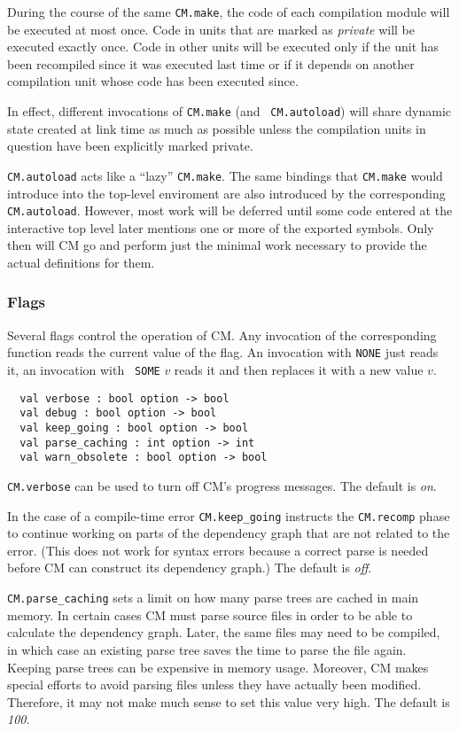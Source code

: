 \documentclass{article}
\begin{document}
During the course of the same {\tt CM.make}, the code of each
compilation module will be executed at most once.  Code in units that
are marked as {\it private} will be executed exactly once.  Code in
other units will be executed only if the unit has been recompiled
since it was executed last time or if it depends on another
compilation unit whose code has been executed since.

In effect, different invocations of {\tt CM.make} (and {\tt
CM.autoload}) will share dynamic state created at link time as much as
possible unless the compilation units in question have been explicitly
marked private.

{\tt CM.autoload} acts like a ``lazy'' {\tt CM.make}.  The same
bindings that {\tt CM.make} would introduce into the top-level
enviroment are also introduced by the corresponding {\tt CM.autoload}.
However, most work will be deferred until some code entered at the
interactive top level later mentions one or more of the exported
symbols.  Only then will CM go and perform just the minimal work
necessary to provide the actual definitions for them.

\subsubsection*{Flags}

Several flags control the operation of CM.  Any invocation of the
corresponding function reads the current value of the flag.  An
invocation with {\tt NONE} just reads it, an invocation with {\tt
SOME} $v$ reads it and then replaces it with a new value $v$.

\begin{verbatim}
  val verbose : bool option -> bool
  val debug : bool option -> bool
  val keep_going : bool option -> bool
  val parse_caching : int option -> int
  val warn_obsolete : bool option -> bool
\end{verbatim}

{\tt CM.verbose} can be used to turn off CM's progress messages.  The
default is {\em on}.

In the case of a compile-time error {\tt CM.keep\_going} instructs the
{\tt CM.recomp} phase to continue working on parts of the dependency
graph that are not related to the error.  (This does not work for
syntax errors because a correct parse is needed before CM can
construct its dependency graph.)  The default is {\em off}.

{\tt CM.parse\_caching} sets a limit on how many parse trees are
cached in main memory.  In certain cases CM must parse source files in
order to be able to calculate the dependency graph.  Later, the same
files may need to be compiled, in which case an existing parse tree
saves the time to parse the file again.  Keeping parse trees can be
expensive in memory usage.  Moreover, CM makes special efforts to
avoid parsing files unless they have actually been modified.
Therefore, it may not make much sense to set this value very high.
The default is {\em 100}.
\end{document}
